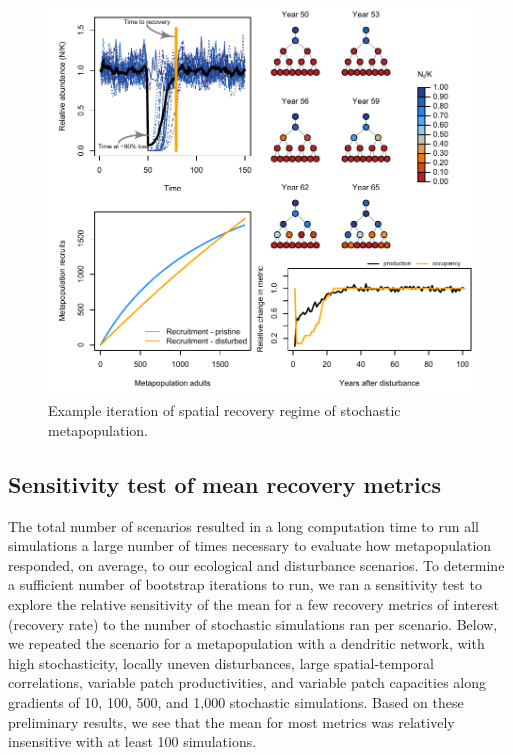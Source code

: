 \documentclass[
]{article}
\begin{document}
\begin{figure}[H]

{\centering \includegraphics{Managing_for_ecological_surprises_in_metapopulations_files/figure-latex/example results5-1} 

}

\caption{Example iteration of spatial recovery regime of stochastic metapopulation.}\label{fig:example results5}
\end{figure}
\newpage

\hypertarget{sensitivity-test-of-mean-recovery-metrics}{%
\subsection{Sensitivity test of mean recovery
metrics}\label{sensitivity-test-of-mean-recovery-metrics}}

The total number of scenarios resulted in a long computation time to run
all simulations a large number of times necessary to evaluate how
metapopulation responded, on average, to our ecological and disturbance
scenarios. To determine a sufficient number of bootstrap iterations to
run, we ran a sensitivity test to explore the relative sensitivity of
the mean for a few recovery metrics of interest (recovery rate) to the
number of stochastic simulations ran per scenario. Below, we repeated
the scenario for a metapopulation with a dendritic network, with high
stochasticity, locally uneven disturbances, large spatial-temporal
correlations, variable patch productivities, and variable patch
capacities along gradients of 10, 100, 500, and 1,000 stochastic
simulations. Based on these preliminary results, we see that the mean
for most metrics was relatively insensitive with at least 100
simulations.
\end{document}
